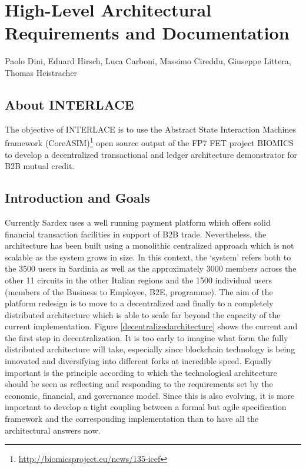 \chapter{High-Level Architectural Requirements and Documentation}
\label{ch:archreq}

\vspace{-1cm}
\begin{center}
Paolo Dini, Eduard Hirsch, Luca Carboni, Massimo Cireddu, Giuseppe Littera, Thomas Heistracher
\end{center}

\section{About INTERLACE}
The objective of INTERLACE is to use the Abstract State Interaction Machines framework (CoreASIM)\footnote{\url{http://biomicsproject.eu/news/135-icef}} open source output of the FP7 FET project BIOMICS to develop a decentralized transactional and ledger architecture demonstrator for B2B mutual credit.

\section{Introduction and Goals}\label{section-introduction-and-goals}
Currently Sardex uses a well running payment platform which offers solid financial transaction facilities in support of B2B trade. Nevertheless, the architecture has been built using a monolithic centralized approach which is not scalable as the system grows in size. In this context, the `system' refers both to the 3500 users in Sardinia as well as the approximately 3000 members across the other 11 circuits in the other Italian regions and the 1500 individual users (members of the Business to Employee, B2E, programme). The aim of the platform redesign is to move to a decentralized and finally to a completely distributed architecture which is able to scale far beyond the capacity of the current implementation. Figure \ref{decentralizedarchitecture} shows the current and the first step in decentralization. It is too early to imagine what form the fully distributed architecture will take, especially since blockchain technology is being innovated and diversifying into different forks at incredible speed. Equally important is the principle according to which the technological architecture should be seen as reflecting and responding to the requirements set by the economic, financial, and governance model. Since this is also evolving, it is more important to develop a tight coupling between a formal but agile specification framework and the corresponding implementation than to have all the architectural answers now.


